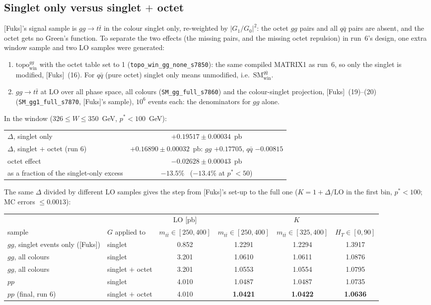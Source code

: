 \documentclass[11pt]{article}
\newcommand{\code}[1]{\texttt{#1}}
\newcommand{\Fuks}{[Fuks]}
\newcommand{\SMwin}{\mathrm{SM}_\mathrm{win}}
\newcommand{\topowin}{\mathrm{topo}_\mathrm{win}}
\begin{document}
\subsection{Singlet only versus singlet $+$ octet}
\label{sec:octetcheck}
\Fuks's signal sample is $gg\to t\bar t$ in the colour singlet only, re-weighted by $|G_1/G_0|^2$: the octet $gg$ pairs and all
$q\bar q$ pairs are absent, and the octet gets no Green's function. To separate the two effects (the missing pairs, and the
missing octet repulsion) in run~6's design, one extra window sample and two LO samples were generated:
\begin{enumerate}
  \item $\topowin^{gg}$ with the octet table set to 1 (\code{topo\_win\_gg\_none\_s7850}): the same compiled MATRIX1 as run~6, so
        only the singlet is modified, \Fuks\ (16). For $q\bar q$ (pure octet) singlet only means unmodified, i.e.\ $\SMwin^{q\bar q}$.
  \item $gg\to t\bar t$ at LO over all phase space, all colours (\code{SM\_gg\_full\_s7860}) and the colour-singlet projection,
        \Fuks\ (19)--(20) (\code{SM\_gg1\_full\_s7870}, \Fuks's sample), $10^6$ events each: the denominators for $gg$ alone.
\end{enumerate}
In the window ($326\le W\le350$~GeV, $p^*<100$~GeV):
\begin{center}\small
\begin{tabular}{@{}lc@{}}
\toprule
$\Delta$, singlet only & $+0.19517\pm0.00034$~pb\\
$\Delta$, singlet $+$ octet (run 6) & $+0.16890\pm0.00032$~pb: $gg$ $+0.17705$, $q\bar q$ $-0.00815$\\
octet effect & $-0.02628\pm0.00043$~pb\\
\quad as a fraction of the singlet-only excess & $-13.5\%$ \ ($-13.4\%$ at $p^*<50$)\\
\bottomrule
\end{tabular}
\end{center}
The same $\Delta$ divided by different LO samples gives the step from \Fuks's set-up to the full one ($K=1+\Delta/\mathrm{LO}$ in
the first bin, $p^*<100$; MC errors $\le0.0013$):
\begin{center}\footnotesize\setlength\tabcolsep{4pt}
\begin{tabular}{@{}llcccc@{}}
\toprule
 & & LO [pb] & \multicolumn{3}{c}{$K$}\\
\cmidrule(lr){3-3}\cmidrule(l){4-6}
sample & $G$ applied to & $m_{t\bar t}\in[250,400]$ & $m_{t\bar t}\in[250,400]$ & $m_{t\bar t}\in[325,400]$ & $H_T\in[0,90]$\\
\midrule
$gg$, singlet events only (\Fuks) & singlet & 0.852 & 1.2291 & 1.2294 & 1.3917\\
$gg$, all colours & singlet & 3.201 & 1.0610 & 1.0611 & 1.0876\\
$gg$, all colours & singlet $+$ octet & 3.201 & 1.0553 & 1.0554 & 1.0795\\
$pp$ & singlet & 4.010 & 1.0487 & 1.0487 & 1.0735\\
$pp$ (final, run 6) & singlet $+$ octet & 4.010 & \textbf{1.0421} & \textbf{1.0422} & \textbf{1.0636}\\
\bottomrule
\end{tabular}
\end{center}
\end{document}
